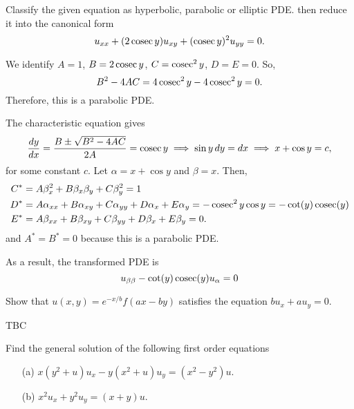 \documentclass[11pt]{penrose}
\begin{document}
\begin{problem}{6}
    Classify the given equation as hyperbolic, parabolic or elliptic PDE. then reduce it into the canonical form
    \begin{equation*}
        u_{xx} + (2 \operatorname{cosec} y) u_{xy} + (\operatorname{cosec} y)^2 u_{yy} = 0.
    \end{equation*}
    
    \solution
    We identify $A = 1$, $B = 2 \operatorname{cosec} y$, $C = \operatorname{cosec}^2 y$, $D = E = 0$. So,
    \begin{equation*}
        B^2 - 4AC = 4 \operatorname{cosec}^2 y - 4 \operatorname{cosec}^2 y = 0.
    \end{equation*}
    Therefore, this is a parabolic PDE.

    The characteristic equation gives
    \begin{equation*}
        \frac{dy}{dx}
        = \frac{B \pm \sqrt{B^2 - 4AC}}{2A}
        = \operatorname{cosec} y
        \implies
        \sin y \,dy = dx
        \implies
        x + \cos y = c,
    \end{equation*}
    for some constant $c$. Let $\alpha = x + \cos y$ and $\beta = x$. Then,
    \begin{align*}
        C^{*} &= A \beta_x^2 + B \beta_x \beta_y + C \beta_y^2 = 1\\
        D^{*} &= A \alpha_{xx} + B \alpha_{xy} + C \alpha_{yy} + D \alpha_{x} + E \alpha_{y} = -\operatorname{cosec}^2 y \cos y = -\cot(y)\operatorname{cosec}(y)\\
        E^{*} &= A \beta_{xx} + B \beta_{xy} + C \beta_{yy} + D \beta_{x} + E \beta_{y} = 0.
    \end{align*}
    and $A^* = B^* = 0$ because this is a parabolic PDE.

    As a result, the transformed PDE is
    \begin{equation*}
        u_{\beta\beta} - \cot(y)\operatorname{cosec}(y) u_\alpha = 0
    \end{equation*}
\end{problem}

\begin{problem}{7}
    Show that $u(x,y) = e^{-x/b} f(ax-by)$ satisfies the equation $b u_x + a u_y = 0$.
    
    \solution TBC
\end{problem}

\begin{problem}{8}
    Find the general solution of the following first order equations
    \begin{enumerate}
        \item[(a)] $x (y^2 + u) u_x - y (x^2 + u) u_y = (x^2 - y^2) u$.
        \item[(b)] $x^2 u_x + y^2 u_y = (x + y) u$.
    \end{enumerate}
    
    \solution
\end{problem}
\end{document}
